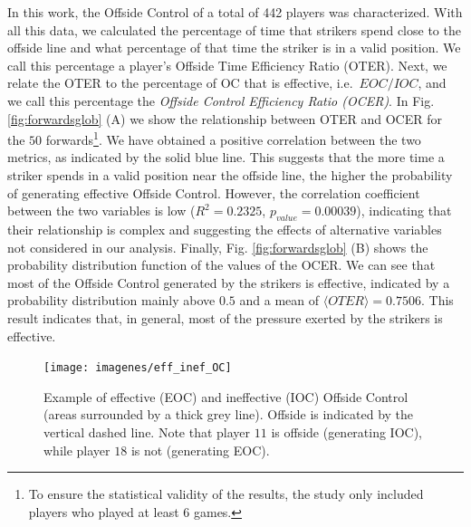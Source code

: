 \documentclass[
  10pt,
  twoside,nohyper]{book}
\begin{document}
In this work, the Offside Control of a total of 442 players was characterized. With all this data, we calculated the percentage of time that strikers spend close to the offside line and what percentage of that time the striker is in a valid position. We call this percentage a player's Offside Time Efficiency Ratio (OTER). Next, we relate the OTER to the percentage of OC that is effective, i.e.~\(EOC/IOC\), and we call this percentage the \emph{Offside Control Efficiency Ratio (OCER)}. In Fig. \ref{fig:forwardsglob} (A) we show the relationship between OTER and OCER for the \(50\) forwards\footnote{To ensure the statistical validity of the results, the study only included players who played at least 6 games.}. We have obtained a positive correlation between the two metrics, as indicated by the solid blue line. This suggests that the more time a striker spends in a valid position near the offside line, the higher the probability of generating effective Offside Control.
However, the correlation coefficient between the two variables is low (\(R^2=0.2325\), \(p_{value} = 0.00039\)), indicating that their relationship is complex and suggesting the effects of alternative variables not considered in our analysis. Finally, Fig. \ref{fig:forwardsglob} (B) shows the probability distribution function of the values of the OCER. We can see that most of the Offside Control generated by the strikers is effective, indicated by a probability distribution mainly above \(0.5\) and a mean of \(\langle OTER \rangle=0.7506\). This result indicates that, in general, most of the pressure exerted by the strikers is effective.

\begin{figure}[H]

{\centering \texttt{[image: imagenes/eff\_inef\_OC]} 

}

\caption{Example of effective (EOC) and ineffective (IOC) Offside Control (areas surrounded by a thick grey line). Offside is indicated by the vertical dashed line. Note that player $11$ is offside (generating IOC), while player $18$ is not (generating EOC).}\label{fig:eff}
\end{figure}
\end{document}
